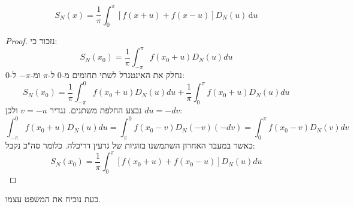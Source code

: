 \documentclass{tstextbook}
\begin{document}
\begin{lemma}
$$S_{N}(x)=\frac{1}{\pi}\int_{0}^{\pi} [f(x+u)+f(x-u)]D_{N}(u) \, \mathrm{d}u $$

\end{lemma}
\begin{proof}
נזכור כי:
$$S_{N}(x_{0})=\frac{1}{\pi}\int_{-\pi}^{\pi}f(x_{0}+u)D_{N}(u)d u$$
נחלק את האינטגרל לשתי תחומים מ-0 ל-\(\pi\) ומ-\(-\pi\) ל-0:
$$S_{N}(x_{0})=\frac{1}{\pi}\int_{-\pi}^{0}f(x_{0}+u)D_{N}(u)d u+\frac{1}{\pi}\int_{0}^{\pi}f(x_{0}+u)D_{N}(u)d u$$
נבצע החלפת משתנים. נגדיר \(v=-u\) ולכן \(du=-dv\):
$$\int_{-\pi}^{0}f(x_{0}+u)D_{N}(u)d u=\int_{\pi}^{0}f(x_{0}-v)D_{N}(-v)(-d v)=\int_{0}^{\pi}f(x_{0}-v)D_{N}(v)d v$$
כאשר במעבר האחרון השתמשנו בזוגיות של גרעין דריכלה. כלומר סה"כ נקבל:
$$S_{N}(x_{0})=\frac{1}{\pi}\int_{0}^{\pi}[f(x_{0}+u)+f(x_{0}-u)]D_{N}(u)d u$$

\end{proof}
כעת נוכיח את המשפט עצמו.
\end{document}
